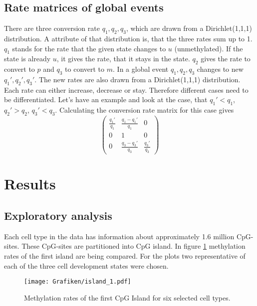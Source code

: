 \documentclass[12pt]{article} %
\begin{document}
	\subsection{Rate matrices of global events}
	There are three conversion rate $q_1, q_2, q_3$, which are drawn from a Dirichlet(1,1,1) distribution. A attribute of that distribution is, that the three rates sum up to 1. $q_1$ stands for the rate that the given state changes to $u$ (unmethylated). If the state is already $u$, it gives the rate, that it stays in the state. $q_2$ gives the rate to convert to $p$ and $q_3$ to convert to $m$.
	In a global event $q_1, q_2, q_3$ changes to new $q_1', q_2', q_3'$. The new rates are also drawn from a Dirichlet(1,1,1) distribution. Each rate can either increase, decrease or stay. Therefore different cases need to be differentiated.
	Let's have an example and look at the case, that $q_1' < q_1$, $q_2' > q_2$, $q_3' < q_3$. Calculating the conversion rate matrix for this case gives
	\begin{equation*}
	\begin{pmatrix}
	\frac{q_1'}{q_1} & \frac{q_1-q_1'}{q_1} & 0\\
	0 & 1 & 0\\
	0 & \frac{q_3-q_3'}{q_3} & \frac{q_3'}{q_3}
	\end{pmatrix}
	\end{equation*}
	
	
	\section{Results}
	\subsection{Exploratory analysis}
	Each cell type in the data has information about approximately 1.6 million CpG-sites. These CpG-sites are partitioned into CpG island. In figure \ref{img:island_1} methylation rates of the first island are being compared. For the plots two representative of each of the three cell development states were chosen.\\
	
	\begin{figure}[h]
		\texttt{[image: Grafiken/island\_1.pdf]}
		\caption{Methylation rates of the first CpG Island for six selected cell types. }
	\label{img:island_1}
	\end{figure}
	
\end{document}
